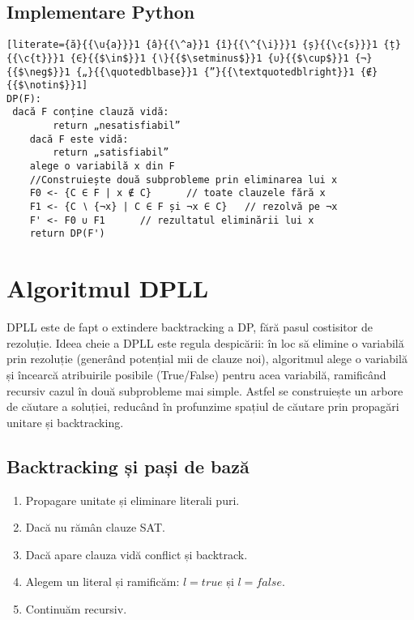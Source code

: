 \documentclass[12pt]{article}
\begin{document}
\subsection{Implementare Python}
\begin{lstlisting}[literate={ă}{{\u{a}}}1 {â}{{\^a}}1 {î}{{\^{\i}}}1 {ș}{{\c{s}}}1 {ț}{{\c{t}}}1 {∈}{{$\in$}}1 {∖}{{$\setminus$}}1 {∪}{{$\cup$}}1 {¬}{{$\neg$}}1 {„}{{\quotedblbase}}1 {”}{{\textquotedblright}}1 {∉}{{$\notin$}}1]
DP(F):
 dacă F conține clauză vidă:
        return „nesatisfiabil”
    dacă F este vidă:
        return „satisfiabil”
    alege o variabilă x din F
    //Construiește două subprobleme prin eliminarea lui x
    F0 <- {C ∈ F | x ∉ C}      // toate clauzele fără x
    F1 <- {C ∖ {¬x} | C ∈ F și ¬x ∈ C}   // rezolvă pe ¬x
    F' <- F0 ∪ F1      // rezultatul eliminării lui x
    return DP(F')
\end{lstlisting}

\section{Algoritmul DPLL}
DPLL este de fapt o extindere backtracking a DP, fără pasul costisitor de rezoluție. Ideea cheie a DPLL este regula despicării: în loc să elimine o variabilă prin rezoluție (generând potențial mii de clauze noi), algoritmul alege o variabilă și încearcă atribuirile posibile (True/False) pentru acea variabilă, ramificând recursiv cazul în două subprobleme mai simple. \cite{dpll1962} Astfel se construiește un arbore de căutare a soluției, reducând în profunzime spațiul de căutare prin propagări unitare și backtracking.
\subsection{Backtracking și pași de bază}
\begin{enumerate}
  \item Propagare unitate și eliminare literali puri.
  \item Dacă nu rămân clauze \textemdash{} SAT.
  \item Dacă apare clauza vidă \textemdash{} conflict și backtrack.
  \item Alegem un literal și ramificăm: $l=true$ și $l=false$.
  \item Continuăm recursiv.
\end{enumerate}
\end{document}
